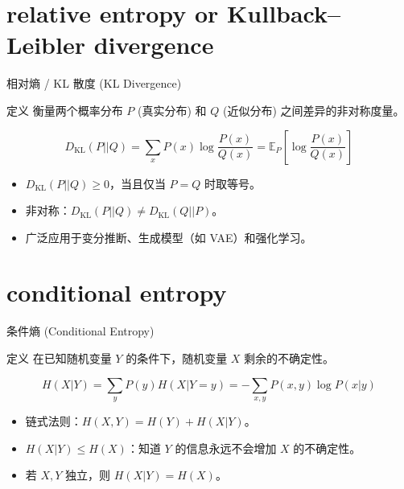 \documentclass[12pt, t, aspectratio=169]{beamer}
\newcommand{\E}{\mathbb{E}}
\newcommand{\KL}{D_{\text{KL}}}
\begin{document}
\section{relative entropy or Kullback–Leibler divergence}
\begin{frame}{相对熵 / KL 散度 (KL Divergence)}
    \begin{block}{定义}
        衡量两个概率分布 $P$ (真实分布) 和 $Q$ (近似分布) 之间差异的非对称度量。
    \end{block}
    
    \begin{equation*}
        \KL(P||Q) = \sum_{x} P(x) \log \frac{P(x)}{Q(x)} = \E_{P} \left[ \log \frac{P(x)}{Q(x)} \right]
    \end{equation*}
    
    \vspace{0.2cm}
    \begin{itemize}
        \item $\KL(P||Q) \geq 0$，当且仅当 $P=Q$ 时取等号。
        \item 非对称：$\KL(P||Q) \neq \KL(Q||P)$。
        \item 广泛应用于变分推断、生成模型（如 VAE）和强化学习。
    \end{itemize}
\end{frame}

\section{conditional entropy}
\begin{frame}{条件熵 (Conditional Entropy)}
    \begin{block}{定义}
        在已知随机变量 $Y$ 的条件下，随机变量 $X$ 剩余的不确定性。
    \end{block}
    
    \begin{equation*}
        H(X|Y) = \sum_{y} P(y) H(X|Y=y) = - \sum_{x,y} P(x,y) \log P(x|y)
    \end{equation*}
    
    \vspace{0.2cm}
    \begin{itemize}
        \item 链式法则：$H(X, Y) = H(Y) + H(X|Y)$。
        \item $H(X|Y) \leq H(X)$：知道 $Y$ 的信息永远不会增加 $X$ 的不确定性。
        \item 若 $X, Y$ 独立，则 $H(X|Y) = H(X)$。
    \end{itemize}
\end{frame}
\end{document}
